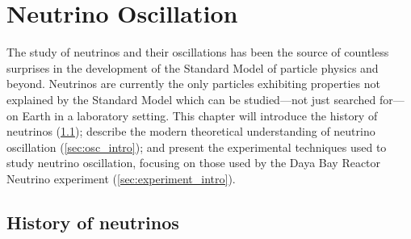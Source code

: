 \chapter{Neutrino Oscillation}
\label{ch:intro}

The study of neutrinos and their oscillations has been the source
of countless surprises in the development of the
Standard Model of particle physics and beyond.
Neutrinos are currently the only particles exhibiting properties
not explained by the Standard Model
which can be studied---not just searched for---on Earth in a laboratory setting.
This chapter will introduce the history of neutrinos (\cref{sec:history});
describe the modern theoretical understanding of neutrino oscillation
(\cref{sec:osc_intro});
and present the experimental techniques used to study neutrino oscillation,
focusing on those used by the Daya Bay Reactor Neutrino experiment (\cref{sec:experiment_intro}).

\section{History of neutrinos}
\label{sec:history}

